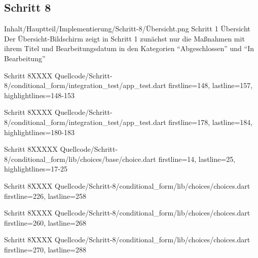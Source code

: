 \ifincludeall \clearpage \fi 

\subsection{Schritt 8}

\begin{alexfigure}{Inhalt/Hauptteil/Implementierung/Schritt-8/Übersicht.png}
  {Schritt 1 Übersicht}
  {Der Übersicht-Bildschirm zeigt in  Schritt 1 zunächst nur die Maßnahmen mit ihrem Titel und Bearbeitungsdatum in den Kategorien \enquote{Abgeschlossen} und \enquote{In Bearbeitung}}

  \label{fig:Schritt1Uebersicht}

\end{alexfigure}

\ifincludeall \clearpage \fi 


\begin{alexlisting}{Schritt 8}{XXXX}
    {Quellcode/Schritt-8/conditional_form/integration_test/app_test.dart}
    {firstline=148, lastline=157, highlightlines={148-153}}
    \label{lst:Schritt8XXXX}
  \end{alexlisting}

  \begin{alexlisting}{Schritt 8}{XXXX}
    {Quellcode/Schritt-8/conditional_form/integration_test/app_test.dart}
    {firstline=178, lastline=184, highlightlines={180-183}}
    \label{lst:Schritt8XXXX}
  \end{alexlisting}


  \begin{alexlisting}{Schritt 8}{XXXXX}
    {Quellcode/Schritt-8/conditional_form/lib/choices/base/choice.dart}
    {firstline=14, lastline=25, highlightlines={17-25}}
    \label{lst:Schritt4XXXXX}
  \end{alexlisting}

  \begin{alexlisting}{Schritt 8}{XXXX}
    {Quellcode/Schritt-8/conditional_form/lib/choices/choices.dart}
    {firstline=226, lastline=258}
    \label{lst:Schritt8XXXX}
  \end{alexlisting}

  \begin{alexlisting}{Schritt 8}{XXXX}
    {Quellcode/Schritt-8/conditional_form/lib/choices/choices.dart}
    {firstline=260, lastline=268}
    \label{lst:Schritt8XXXX}
  \end{alexlisting}

  \begin{alexlisting}{Schritt 8}{XXXX}
    {Quellcode/Schritt-8/conditional_form/lib/choices/choices.dart}
    {firstline=270, lastline=288}
    \label{lst:Schritt8XXXX}
  \end{alexlisting}


